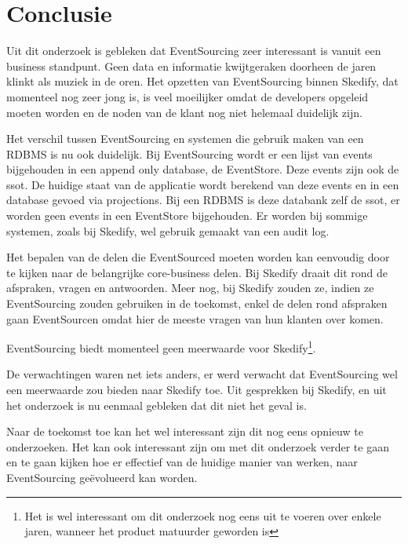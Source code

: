 
\chapter{Conclusie}
\label{ch:conclusie}


Uit dit onderzoek is gebleken dat EventSourcing zeer interessant is vanuit een business standpunt. Geen data en informatie kwijtgeraken doorheen de jaren klinkt als muziek in de oren. Het opzetten van EventSourcing binnen Skedify, dat momenteel nog zeer jong is, is veel moeilijker omdat de developers opgeleid moeten worden en de noden van de klant nog niet helemaal duidelijk zijn.

Het verschil tussen EventSourcing en systemen die gebruik maken van een \gls{RDBMS} is nu ook duidelijk. Bij EventSourcing wordt er een lijst van events bijgehouden in een append only database, de EventStore. Deze events zijn ook de \gls{ssot}. De huidige staat van de applicatie wordt berekend van deze events en in een database gevoed via projections. Bij een \gls{RDBMS} is deze databank zelf de \gls{ssot}, er worden geen events in een EventStore bijgehouden. Er worden bij sommige systemen, zoals bij Skedify, wel gebruik gemaakt van een audit log.

Het bepalen van de delen die EventSourced moeten worden kan eenvoudig door te kijken naar de belangrijke core-business delen. Bij Skedify draait dit rond de afspraken, vragen en antwoorden. Meer nog, bij Skedify zouden ze, indien ze EventSourcing zouden gebruiken in de toekomst, enkel de delen rond afspraken gaan EventSourcen omdat hier de meeste vragen van hun klanten over komen.

EventSourcing biedt momenteel geen meerwaarde voor Skedify\footnote{Het is wel interessant om dit onderzoek nog eens uit te voeren over enkele jaren, wanneer het product matuurder geworden is}.

De verwachtingen waren net iets anders, er werd verwacht dat EventSourcing wel een meerwaarde zou bieden naar Skedify toe. Uit gesprekken bij Skedify, en uit het onderzoek is nu eenmaal gebleken dat dit niet het geval is.

Naar de toekomst toe kan het wel interessant zijn dit nog eens opnieuw te onderzoeken. Het kan ook interessant zijn om met dit onderzoek verder te gaan en te gaan kijken hoe er effectief van de huidige manier van werken, naar EventSourcing geëvolueerd kan worden.